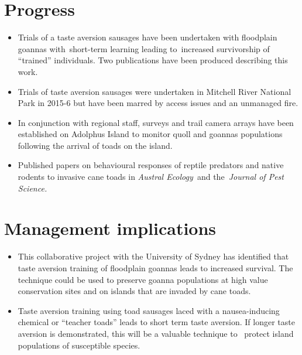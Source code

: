 \documentclass[version=last,
    paper=a4, %
    10pt, %
    usenames,
    dvipsnames,
    oneside, %
    headings=openany, %
    DIV=15 %
]{scrbook}
\begin{document}
\section*{Progress}
\begin{itemize}
\itemsep1pt\parskip0pt
\item
  Trials of a taste aversion sausages have been undertaken with
  floodplain goannas with~short-term learning leading to~increased
  survivorship of ``trained'' individuals. Two publications have been
  produced describing this work.
\item
  Trials of taste aversion sausages were undertaken in Mitchell River
  National Park in 2015-6 but have been marred by access issues and an
  unmanaged fire.
\item
  In conjunction with regional staff, surveys and trail camera arrays
  have been established on Adolphus Island to monitor quoll and goannas
  populations following the arrival of toads on the island.
\item
  Published papers on behavioural responses of reptile predators and
  native rodents to invasive cane toads in \emph{Austral Ecology~}and
  the~\emph{Journal of Pest Science.}
\end{itemize}



\section*{Management implications}
\begin{itemize}
\itemsep1pt\parskip0pt
\item
  This collaborative project with the University of Sydney has
  identified that taste aversion training of floodplain goannas leads to
  increased survival. The technique could be used to preserve goanna
  populations at high value conservation sites and on islands that are
  invaded by cane toads.
\item
  Taste aversion training using toad sausages laced with a
  nausea-inducing chemical or ``teacher toads'' leads to short term
  taste aversion. If longer taste aversion is demonstrated, this will be
  a valuable technique to~ protect island populations of susceptible
  species.
\end{itemize}
\end{document}
